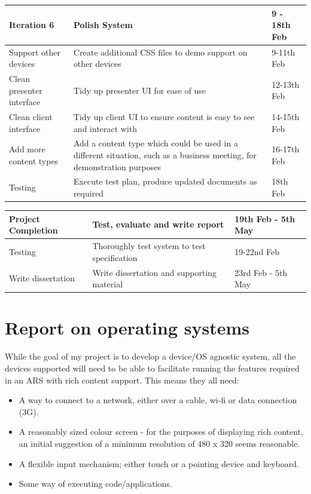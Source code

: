 \documentclass[a4papert,11pt,notitlepage]{article}
\begin{document}
\begin{appendices}
\begin{tabular}{p{5cm} p{7cm} p{4cm}}
\hline
Iteration 6 & Polish System & 9 - 18th Feb \\
\hline
Support other devices & Create additional CSS files to demo support on other devices & 9-11th Feb \\
Clean presenter interface & Tidy up presenter UI for ease of use & 12-13th Feb \\
Clean client interface & Tidy up client UI to ensure content is easy to see and interact with & 14-15th Feb \\
Add more content types & Add a content type which could be used in a different situation, such as a business meeting, for demonstration purposes & 16-17th Feb \\
Testing & Execute test plan, produce updated documents as required & 18th Feb \\
\end{tabular}

\begin{tabular}{p{5cm} p{7cm} p{4cm}}
\hline
Project Completion & Test, evaluate and write report & 19th Feb - 5th May \\
\hline
Testing & Thoroughly test system to test specification & 19-22nd Feb \\
Write dissertation & Write dissertation and supporting material & 23rd Feb - 5th May \\
\end{tabular}

\pagebreak
\section{Report on operating systems}
\label{app:osreport}
\label{sec:devices}
While the goal of my project is to develop a device/OS agnostic system, all the devices supported will need to be able to facilitate running the features required in an ARS with rich content support. This means they all need:
\begin{itemize}
\item A way to connect to a network, either over a cable, wi-fi or data connection (3G).
\item A reasonably sized colour screen - for the purposes of displaying rich content, an initial suggestion of a minimum resolution of 480 x 320 seems reasonable.
\item A flexible input mechanism; either touch or a pointing device and keyboard.
\item Some way of executing code/applications.
\end{itemize}


\end{appendices}
\end{document}
